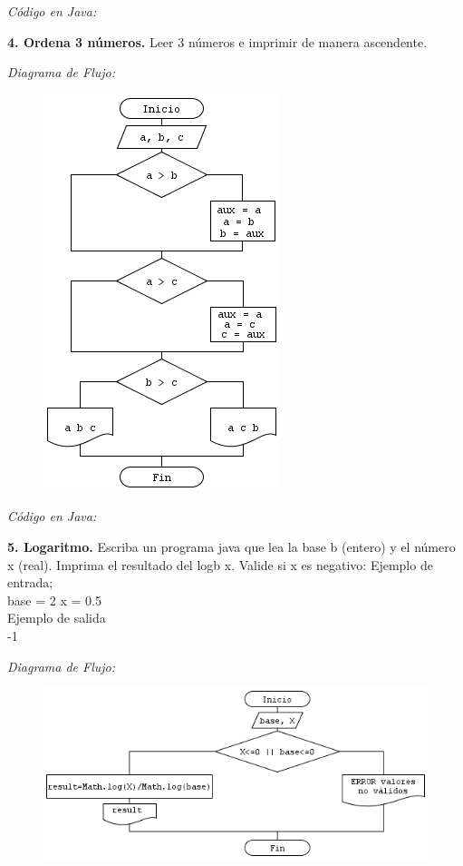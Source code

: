 \documentclass[12pt]{article}
\begin{document}
\textit{Código en Java:}

\newpage


\textbf{4. Ordena 3 números.}  Leer 3 números e imprimir de manera ascendente.  

\textit{Diagrama de Flujo:  }
\begin{figure}[h!]
\centering
	\includegraphics[scale=0.85]{dicor/OrdenaTresNumeros.png}    
\end{figure}

\textit{Código en Java:}

\newpage


\textbf{5. Logaritmo.} Escriba un programa java que lea la base b (entero) y el número x (real).
Imprima el resultado del logb x. Valide si x es negativo:
Ejemplo de entrada; \\
base = 2 
x = 0.5\\
Ejemplo de salida\\
-1

\textit{Diagrama de Flujo:  }
\begin{figure}[h!]
\centering
	\includegraphics[scale=0.70]{dicor/Logaritmo.png}    
\end{figure}
\end{document}

